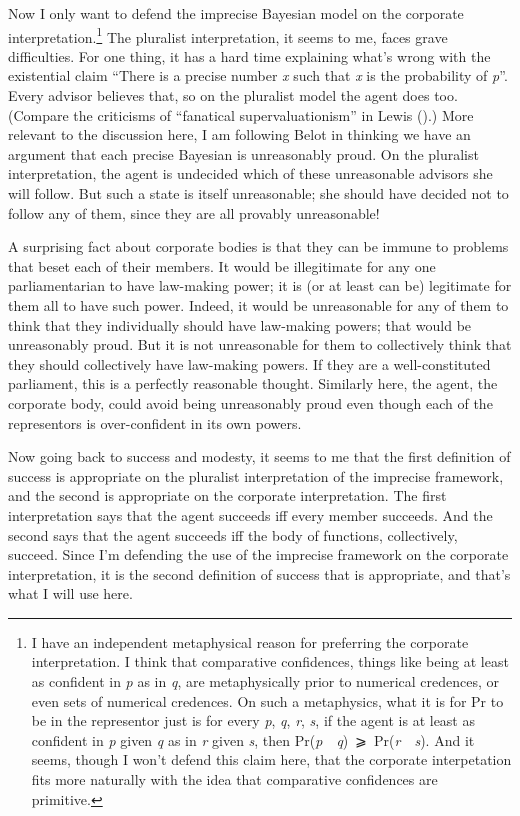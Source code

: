 \documentclass[
  11pt,
  letterpaper,
  DIV=11,
  numbers=noendperiod,
  twoside]{scrartcl}
\begin{document}
Now I only want to defend the imprecise Bayesian model on the corporate
interpretation.\footnote{I have an independent metaphysical reason for
  preferring the corporate interpretation. I think that comparative
  confidences, things like being at least as confident in \emph{p} as in
  \emph{q}, are metaphysically prior to numerical credences, or even
  sets of numerical credences. On such a metaphysics, what it is for Pr
  to be in the representor just is for every \emph{p}, \emph{q},
  \emph{r}, \emph{s}, if the agent is at least as confident in \emph{p}
  given \emph{q} as in \emph{r} given \emph{s}, then
  Pr(\emph{p}~\textbar~\emph{q})~⩾~Pr(\emph{r}~\textbar~\emph{s}). And
  it seems, though I won't defend this claim here, that the corporate
  interpetation fits more naturally with the idea that comparative
  confidences are primitive.} The pluralist interpretation, it seems to
me, faces grave difficulties. For one thing, it has a hard time
explaining what's wrong with the existential claim ``There is a precise
number \emph{x} such that \emph{x} is the probability of \emph{p}''.
Every advisor believes that, so on the pluralist model the agent does
too. (Compare the criticisms of ``fanatical supervaluationism'' in Lewis
().) More relevant to the discussion
here, I am following Belot in thinking we have an argument that each
precise Bayesian is unreasonably proud. On the pluralist interpretation,
the agent is undecided which of these unreasonable advisors she will
follow. But such a state is itself unreasonable; she should have decided
not to follow any of them, since they are all provably unreasonable!

A surprising fact about corporate bodies is that they can be immune to
problems that beset each of their members. It would be illegitimate for
any one parliamentarian to have law-making power; it is (or at least can
be) legitimate for them all to have such power. Indeed, it would be
unreasonable for any of them to think that they individually should have
law-making powers; that would be unreasonably proud. But it is not
unreasonable for them to collectively think that they should
collectively have law-making powers. If they are a well-constituted
parliament, this is a perfectly reasonable thought. Similarly here, the
agent, the corporate body, could avoid being unreasonably proud even
though each of the representors is over-confident in its own powers.

Now going back to success and modesty, it seems to me that the first
definition of success is appropriate on the pluralist interpretation of
the imprecise framework, and the second is appropriate on the corporate
interpretation. The first interpretation says that the agent succeeds
iff every member succeeds. And the second says that the agent succeeds
iff the body of functions, collectively, succeed. Since I'm defending
the use of the imprecise framework on the corporate interpretation, it
is the second definition of success that is appropriate, and that's what
I will use here.
\end{document}
